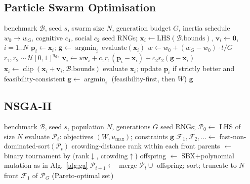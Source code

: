 \subsection{Particle Swarm Optimisation}
\label{sec:method:pseudocode:pso}

\begin{algorithm}[H]
\small
\caption{Particle Swarm Optimisation for truss sizing (\texttt{src/algorithms/pso.py})}
\label{alg:pso}
\begin{algorithmic}[1]
\Require benchmark $\mathcal{B}$, seed $s$, swarm size $N$, generation budget $G$,
  inertia schedule $w_0\!\to\!w_G$, cognitive $c_1$, social $c_2$
\State seed RNGs; $\mathbf{x}_i\gets\text{LHS}(\mathcal{B}.\text{bounds})$, $\mathbf{v}_i\gets\mathbf{0}$, $i=1..N$
\State $\mathbf{p}_i\gets\mathbf{x}_i$; $\mathbf{g}\gets\operatorname{argmin}_i\ \text{evaluate}(\mathbf{x}_i)$
  \State $w\gets w_0 + (w_G-w_0)\cdot t/G$
    \State $r_1,r_2\sim\mathcal{U}[0,1]^{n_{\mathrm{dv}}}$
    \State $\mathbf{v}_i\gets w\mathbf{v}_i
      + c_1 r_1(\mathbf{p}_i-\mathbf{x}_i)
      + c_2 r_2(\mathbf{g}-\mathbf{x}_i)$
    \State $\mathbf{x}_i\gets\operatorname{clip}(\mathbf{x}_i+\mathbf{v}_i,\mathcal{B}.\text{bounds})$
    \State evaluate $\mathbf{x}_i$; update $\mathbf{p}_i$ if strictly better and feasibility-consistent
  \EndFor
  \State $\mathbf{g}\gets\operatorname{argmin}_i$ (feasibility-first, then $W$)
\EndFor
\State \Return $\mathbf{g}$
\end{algorithmic}
\end{algorithm}

\subsection{NSGA-II}
\label{sec:method:pseudocode:nsga2}

\begin{algorithm}[H]
\small
\caption{NSGA-II for weight-vs-displacement Pareto front
  (\texttt{src/algorithms/nsga2.py})}
\label{alg:nsga2}
\begin{algorithmic}[1]
\Require benchmark $\mathcal{B}$, seed $s$, population $N$, generations $G$
\State seed RNGs; $\mathcal{P}_0\gets$ LHS of size $N$
  \State evaluate $\mathcal{P}_t$: objectives $(W, u_{\max})$; constraints $\mathbf{g}$
  \State $\mathcal{F}_1,\mathcal{F}_2,\dots\gets$ fast-non-dominated-sort$(\mathcal{P}_t)$
  \State crowding-distance rank within each front
  \State parents $\gets$ binary tournament by (rank$\downarrow$, crowding$\uparrow$)
  \State offspring $\gets$ SBX+polynomial mutation as in Alg.~\ref{alg:ga}
  \State $\mathcal{P}_{t+1}\gets$ merge $\mathcal{P}_t\cup$ offspring; sort; truncate to $N$
\EndFor
\State \Return front $\mathcal{F}_1$ of $\mathcal{P}_G$ (Pareto-optimal set)
\end{algorithmic}
\end{algorithm}

